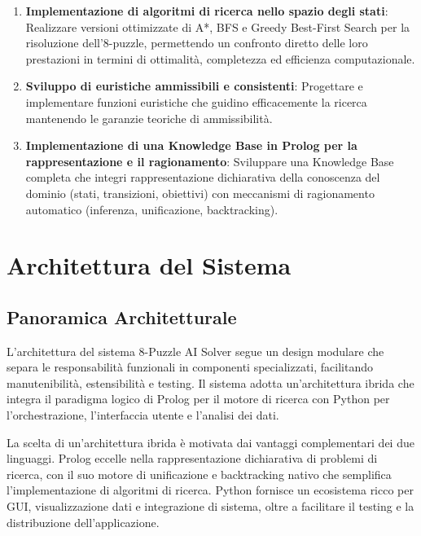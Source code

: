 \documentclass[12pt,a4paper]{report}
\theoremstyle{definition}
\begin{document}
\begin{enumerate}
    \item \textbf{Implementazione di algoritmi di ricerca nello spazio degli stati}: Realizzare versioni ottimizzate di A*, BFS e Greedy Best-First Search per la risoluzione dell'8-puzzle, permettendo un confronto diretto delle loro prestazioni in termini di ottimalità, completezza ed efficienza computazionale.
    
    \item \textbf{Sviluppo di euristiche ammissibili e consistenti}: Progettare e implementare funzioni euristiche che guidino efficacemente la ricerca mantenendo le garanzie teoriche di ammissibilità.
    
    \item \textbf{Implementazione di una Knowledge Base in Prolog per la rappresentazione e il ragionamento}: Sviluppare una Knowledge Base completa che integri rappresentazione dichiarativa della conoscenza del dominio (stati, transizioni, obiettivi) con meccanismi di ragionamento automatico (inferenza, unificazione, backtracking).
\end{enumerate}


\chapter{Architettura del Sistema}

\section{Panoramica Architetturale}

L'architettura del sistema 8-Puzzle AI Solver segue un design modulare che separa le responsabilità funzionali in componenti specializzati, facilitando manutenibilità, estensibilità e testing. Il sistema adotta un'architettura ibrida che integra il paradigma logico di Prolog per il motore di ricerca con Python per l'orchestrazione, l'interfaccia utente e l'analisi dei dati.

La scelta di un'architettura ibrida è motivata dai vantaggi complementari dei due linguaggi. Prolog eccelle nella rappresentazione dichiarativa di problemi di ricerca, con il suo motore di unificazione e backtracking nativo che semplifica l'implementazione di algoritmi di ricerca. Python fornisce un ecosistema ricco per GUI, visualizzazione dati e integrazione di sistema, oltre a facilitare il testing e la distribuzione dell'applicazione.
\end{document}
